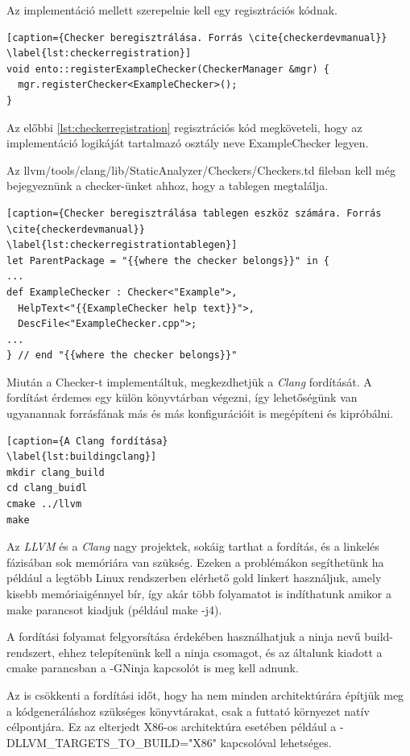 \documentclass[a4paper,12pt]{report}
\begin{document}
Az implementáció mellett szerepelnie kell egy regisztrációs kódnak.

\begin{lstlisting}[caption={Checker beregisztrálása. Forrás \cite{checkerdevmanual}}
\label{lst:checkerregistration}]
void ento::registerExampleChecker(CheckerManager &mgr) {
  mgr.registerChecker<ExampleChecker>();
}
\end{lstlisting}

Az előbbi \ref{lst:checkerregistration} regisztrációs kód megköveteli, hogy az implementáció logikáját tartalmazó osztály neve ExampleChecker legyen.

Az llvm/tools/clang/lib/StaticAnalyzer/Checkers/Checkers.td fileban kell még bejegyeznünk a checker-ünket ahhoz, hogy a tablegen megtalálja.

\begin{lstlisting}[caption={Checker beregisztrálása tablegen eszköz számára. Forrás \cite{checkerdevmanual}}
\label{lst:checkerregistrationtablegen}]
let ParentPackage = "{{where the checker belongs}}" in {
...
def ExampleChecker : Checker<"Example">,
  HelpText<"{{ExampleChecker help text}}">,
  DescFile<"ExampleChecker.cpp">;
...
} // end "{{where the checker belongs}}"
\end{lstlisting}

Miután a Checker-t implementáltuk, megkezdhetjük a \emph{Clang} fordítását. A fordítást érdemes egy külön könyvtárban végezni, így lehetőségünk van ugyanannak forrásfának más és más konfigurációit is megépíteni és kipróbálni.

\begin{lstlisting}[caption={A Clang fordítása}
\label{lst:buildingclang}]
mkdir clang_build
cd clang_buidl
cmake ../llvm
make
\end{lstlisting}

Az \emph{LLVM} és a \emph{Clang} nagy projektek, sokáig tarthat a fordítás, és a linkelés fázisában sok memóriára van szükség. Ezeken a problémákon segíthetünk ha például a legtöbb Linux rendszerben elérhető gold linkert használjuk, amely kisebb memóriaigénnyel bír, így akár több folyamatot is indíthatunk amikor a make parancsot kiadjuk (például make -j4).

A fordítási folyamat felgyorsítása érdekében használhatjuk a ninja nevű build-rendszert, ehhez telepítenünk kell a ninja csomagot, és az általunk kiadott a cmake parancsban a -GNinja kapcsolót is meg kell adnunk.

Az is csökkenti a fordítási időt, hogy ha nem minden architektúrára építjük meg a kódgeneráláshoz szükséges könyvtárakat, csak a futtató környezet natív célpontjára. Ez az elterjedt X86-os architektúra esetében például a -DLLVM\_TARGETS\_TO\_BUILD="X86" kapcsolóval lehetséges.
\end{document}
